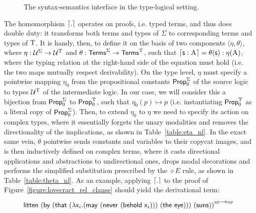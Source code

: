 \begin{figure}
	\centering
	\caption{The syntax-semantics interface in the type-logical setting.}
	\label{figure:synsemtlg}
\end{figure}

The homomorphism $\lceil{.}\rceil$ operates on proofs, i.e. typed terms, and thus does double duty: it transforms both terms and types of $\Sigma$ to corresponding terms and types of $\mathrm{T}$.
It is handy, then, to define it on the basis of two components $\langle \eta, \theta \rangle$, where $\eta : \mathcal{U}^{\Sigma} \to \mathcal{U}^{\mathrm{T}}$ and $\theta: \mathsf{Terms}^{\Sigma} \to \mathsf{Terms}^{\mathrm{T}}$, such that $\lceil{\ensuremath{\mathsf{s}}:  \ensuremath{\normalfont\textsc{A}}}\rceil = \theta({\mathsf{s}}) : \eta({\normalfont\textsc{A}})$, where the typing relation at the right-hand side of the equation must hold (i.e. the two maps mutually respect derivability).
On the type level, $\eta$ must specify a pointwise mapping $\eta_0$ from the propositional constants $\mathsf{Prop}_0^{\Sigma}$ of the source logic to types $\mathcal{U}^{\mathrm{T}}$ of the intermediate logic.
In our case, we will consider this a bijection from $\mathsf{Prop}_0^{\Sigma}$ to $\mathsf{Prop}_0^{\mathrm{T}}$, such that $\eta_0(p) \mapsto p$ (i.e. instantiating $\mathsf{Prop}_0^{\mathrm{T}}$ as a literal copy of $\mathsf{Prop}_0^{\Sigma}$).
Then, to extend $\eta_0$ to $\eta$ we need to specify its action on complex types, where it essentially forgets the unary modalities and removes the directionality of the implications, as shown in Table~\ref{table:eta_nl}.
In the exact same vein, $\theta$ pointwise sends constants and variables to their copycat images, and is then inductively defined on complex terms, where it casts directional applications and abstractions to undirectional ones, drops modal decorations and performs the simplified substitution prescribed by the $\diamond E$ rule, as shown in Table~\ref{table:theta_nl}.
As an example, applying $\lceil{.}\rceil$ to the proof of Figure~\ref{figure:lovecract_rel_clause} should yield the derivational term:
\begin{equation}\label{equation:litten_derterm}
\term{litten~(by~(that~(\lam \vari .(may~(never~(behold~\vari )))~(the~eye)))~(suns))}^{\prop{np}\li\prop{np}}
\end{equation}

